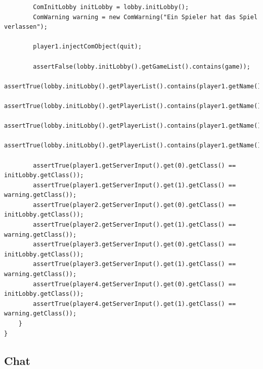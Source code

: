\documentclass[twoside]{article}
\begin{document}
\begin{lstlisting}
		ComInitLobby initLobby = lobby.initLobby();
		ComWarning warning = new ComWarning("Ein Spieler hat das Spiel verlassen");
		
		player1.injectComObject(quit);

		assertFalse(lobby.initLobby().getGameList().contains(game));
		assertTrue(lobby.initLobby().getPlayerList().contains(player1.getName()));
		assertTrue(lobby.initLobby().getPlayerList().contains(player1.getName()));
		assertTrue(lobby.initLobby().getPlayerList().contains(player1.getName()));
		assertTrue(lobby.initLobby().getPlayerList().contains(player1.getName()));
		
		assertTrue(player1.getServerInput().get(0).getClass() == initLobby.getClass());
		assertTrue(player1.getServerInput().get(1).getClass() == warning.getClass());
		assertTrue(player2.getServerInput().get(0).getClass() == initLobby.getClass());
		assertTrue(player2.getServerInput().get(1).getClass() == warning.getClass());
		assertTrue(player3.getServerInput().get(0).getClass() == initLobby.getClass());
		assertTrue(player3.getServerInput().get(1).getClass() == warning.getClass());
		assertTrue(player4.getServerInput().get(0).getClass() == initLobby.getClass());
		assertTrue(player4.getServerInput().get(1).getClass() == warning.getClass());
	}
}
\end{lstlisting}

\subsection{Chat}
\end{document}

